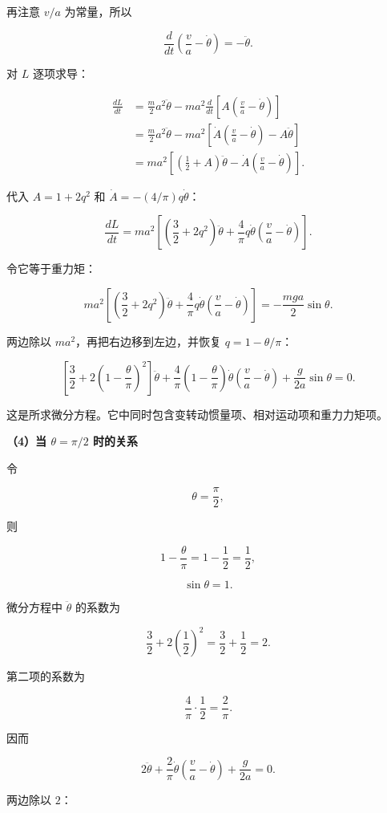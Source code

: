 \documentclass[12pt,a4paper,UTF8]{ctexart}
\begin{document}
再注意 \(v/a\) 为常量，所以

\[\frac d{dt}\left(\frac va-\dot\theta\right)=-\ddot\theta.\]

对 \(L\) 逐项求导：

\[\begin{aligned}
\frac{dL}{dt}
&=\frac m2a^2\ddot\theta
-ma^2\frac d{dt}
\left[A\left(\frac va-\dot\theta\right)\right]\\
&=\frac m2a^2\ddot\theta
-ma^2\left[
\dot A\left(\frac va-\dot\theta\right)
-A\ddot\theta
\right]\\
&=ma^2\left[
\left(\frac12+A\right)\ddot\theta
-\dot A\left(\frac va-\dot\theta\right)
\right].
\end{aligned}\]

代入 \(A=1+2q^2\) 和 \(\dot A=-(4/\pi)q\dot\theta\)：

\[\frac{dL}{dt}=ma^2\left[
\left(\frac32+2q^2\right)\ddot\theta
+\frac4\pi q\dot\theta
\left(\frac va-\dot\theta\right)
\right].\]

令它等于重力矩：

\[ma^2\left[
\left(\frac32+2q^2\right)\ddot\theta
+\frac4\pi q\dot\theta
\left(\frac va-\dot\theta\right)
\right]
=-\frac{mga}{2}\sin\theta.\]

两边除以 \(ma^2\)，再把右边移到左边，并恢复 \(q=1-\theta/\pi\)：

\[\boxed{
\left[\frac32+2\left(1-\frac\theta\pi\right)^2\right]\ddot\theta
+\frac4\pi\left(1-\frac\theta\pi\right)\dot\theta
\left(\frac va-\dot\theta\right)
+\frac g{2a}\sin\theta=0
}.\]

这是所求微分方程。它中同时包含变转动惯量项、相对运动项和重力力矩项。

\textbf{（4）当 \(\theta=\pi/2\) 时的关系}

令

\[\theta=\frac\pi2,\]

则

\[1-\frac\theta\pi=1-\frac12=\frac12,\]

\[\sin\theta=1.\]

微分方程中 \(\ddot\theta\) 的系数为

\[\frac32+2\left(\frac12\right)^2
=\frac32+\frac12=2.\]

第二项的系数为

\[\frac4\pi\cdot\frac12=\frac2\pi.\]

因而

\[2\ddot\theta+\frac2\pi\dot\theta
\left(\frac va-\dot\theta\right)+\frac g{2a}=0.\]

两边除以 \(2\)：
\end{document}
